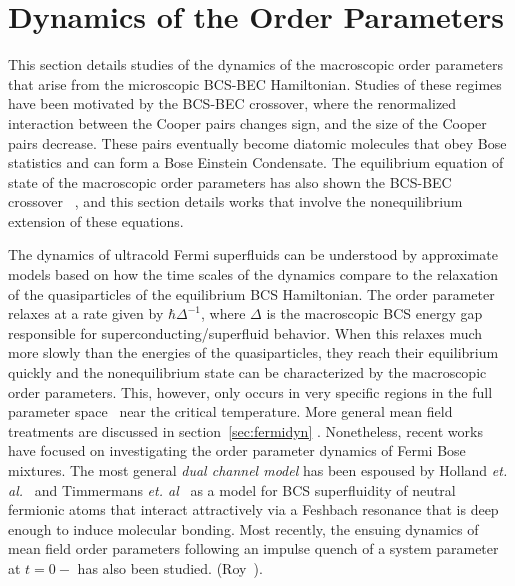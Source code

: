 \documentclass[aps,pra,floats,epsfig,pdflatex]{revtex4}                                                              %
\begin{document}
\section{Dynamics of the Order Parameters}
\label{sec:myoldstuff}
 {This section details studies of the dynamics of the macroscopic order parameters that arise from the microscopic BCS-BEC Hamiltonian. Studies of these regimes have been motivated by the BCS-BEC crossover, where the renormalized interaction between the Cooper pairs changes sign, and the size of the Cooper pairs decrease. These pairs eventually become diatomic molecules that obey Bose statistics and can form a Bose Einstein Condensate. The equilibrium equation of state of the macroscopic order parameters has also shown the BCS-BEC crossover}~\cite{huang:becbcs1} {, and this section details works that involve the nonequilibrium extension of these equations.} 

 {The dynamics of ultracold Fermi superfluids can be understood by approximate models based on how the time scales of the dynamics compare to the relaxation of the quasiparticles of the equilibrium BCS Hamiltonian. The order parameter relaxes at a rate given by $\hbar \Delta^{-1}$, where $\Delta$ is the macroscopic BCS energy gap responsible for superconducting/superfluid behavior. When this relaxes much more slowly than the energies of the quasiparticles, they reach their equilibrium quickly and the nonequilibrium state can be characterized by the macroscopic order parameters. This, however, only occurs in very specific regions in the full parameter space}~\cite{gorkov}  {near the critical temperature. More general mean field treatments are discussed in section}~\ref{sec:fermidyn} {. Nonetheless, recent works have focused on investigating the order parameter dynamics of Fermi Bose mixtures. The most general \textit{dual channel model} has been espoused by Holland \textit{et. al.}}~\cite{holland} {and 
Timmermans \textit{et. al}}~\cite{timmermans}  {as a model for BCS superfluidity of neutral fermionic atoms that interact attractively via a Feshbach resonance that is deep enough to induce molecular bonding.} Most recently, the ensuing dynamics of mean field order parameters following an impulse quench of a system parameter at $t=0-$ has also been studied. (Roy~\cite{mypaper4}).
\end{document}
